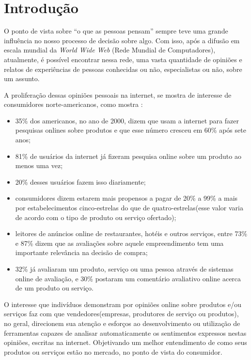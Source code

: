 
\chapter{Introdução}

O ponto de vista sobre “o que as pessoas pensam” sempre teve uma grande influência no nosso processo de decisão sobre algo. Com isso, após a difusão em escala mundial da \textit{World Wide Web} (Rede Mundial de Computadores), atualmente, é possível encontrar nessa rede, uma vasta quantidade de opiniões e relatos de experiências de pessoas conhecidas ou não, especialistas ou não, sobre um assunto.

A proliferação dessas opiniões pessoais na internet, se mostra de interesse de consumidores norte-americanos, como mostra \cite{pewinternet:2008}:

\begin{itemize}

\item 35\% dos americanos, no ano de 2000,  dizem que usam a internet para fazer pesquisas onlines sobre produtos e que esse número cresceu em 60\% após sete anos;

\item 81\% de usuários da internet já fizeram pesquisa online sobre um produto ao menos uma vez;

\item 20\% desses usuários fazem isso diariamente;

\item consumidores dizem estarem mais propensos a pagar de 20\% a 99\% a mais por estabelecimentos cinco-estrelas do que de quatro-estrelas(esse valor varia de acordo com o tipo de produto ou serviço ofertado);

\item leitores de anúncios online de restaurantes, hotéis e outros serviços, entre 73\% e 87\% dizem que as avaliações sobre aquele empreendimento tem uma importante relevância na decisão de compra;

\item 32\% já avaliaram um produto, serviço ou uma pessoa através de sistemas online de avaliação, e 30\% postaram um comentário avaliativo online acerca de um produto ou serviço.

\end{itemize}

O interesse que indivíduos demonstram por opiniões online sobre produtos e/ou serviços faz com que vendedores(empresas, produtores de serviço ou produtos), no geral, direcionem sua atenção e esforços ao desenvolvimento ou utilização de ferramentas capazes de analisar automaticamente os sentimentos expressos nestas opiniões, escritas na internet. Objetivando um melhor entendimento de como seus produtos ou serviços estão no mercado, no ponto de vista do consumidor.

